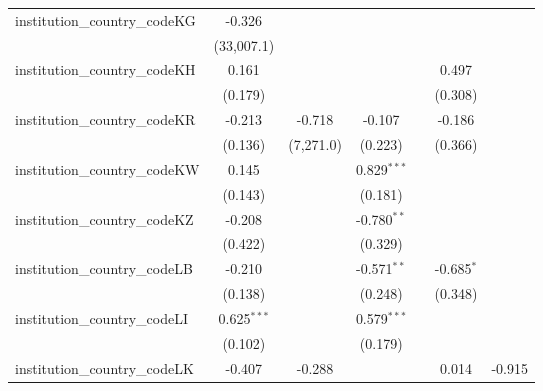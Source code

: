 \begin{tabular}{lcccccc}
   institution\_country\_codeKG          & -0.326         &               &                &                &                &   \\   
                                         & (33,007.1)     &               &                &                &                &   \\   
   institution\_country\_codeKH          & 0.161          &               &                &                & 0.497          &   \\   
                                         & (0.179)        &               &                &                & (0.308)        &   \\   
   institution\_country\_codeKR          & -0.213         & -0.718        & -0.107         &                & -0.186         &   \\   
                                         & (0.136)        & (7,271.0)     & (0.223)        &                & (0.366)        &   \\   
   institution\_country\_codeKW          & 0.145          &               & 0.829$^{***}$  &                &                &   \\   
                                         & (0.143)        &               & (0.181)        &                &                &   \\   
   institution\_country\_codeKZ          & -0.208         &               & -0.780$^{**}$  &                &                &   \\   
                                         & (0.422)        &               & (0.329)        &                &                &   \\   
   institution\_country\_codeLB          & -0.210         &               & -0.571$^{**}$  &                & -0.685$^{*}$   &   \\   
                                         & (0.138)        &               & (0.248)        &                & (0.348)        &   \\   
   institution\_country\_codeLI          & 0.625$^{***}$  &               & 0.579$^{***}$  &                &                &   \\   
                                         & (0.102)        &               & (0.179)        &                &                &   \\   
   institution\_country\_codeLK          & -0.407         & -0.288        &                &                & 0.014          & -0.915\\   

\end{tabular}
